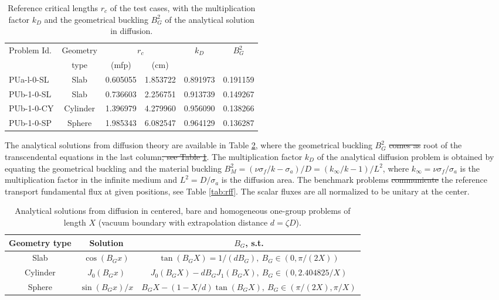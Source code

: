 \documentclass{ictt26}
\providecommand{\DIFadd}[1]{{\protect\color{blue}\uwave{#1}}} %
\providecommand{\DIFdel}[1]{{\protect\color{red}\sout{#1}}}                      %
\providecommand{\DIFaddbegin}{} %
\providecommand{\DIFaddend}{} %
\providecommand{\DIFdelbegin}{} %
\providecommand{\DIFdelend}{} %
\newcommand{\DIFscaledelfig}{0.5}
\newlength{\DIFdelgraphicswidth} %
\newlength{\DIFdelgraphicsheight} %
\newcommand{\DIFaddincludegraphics}[2][]{{\color{blue}\fbox{\DIFOincludegraphics[#1]{#2}}}} %
\newcommand{\DIFdelincludegraphics}[2][]{%
\sbox{\DIFdelgraphicsbox}{\DIFOincludegraphics[#1]{#2}}%
\settoboxwidth{\DIFdelgraphicswidth}{\DIFdelgraphicsbox} %
\settoboxtotalheight{\DIFdelgraphicsheight}{\DIFdelgraphicsbox} %
\scalebox{\DIFscaledelfig}{%
\parbox[b]{\DIFdelgraphicswidth}{\usebox{\DIFdelgraphicsbox}\\[-\baselineskip] \rule{\DIFdelgraphicswidth}{0em}}\llap{\resizebox{\DIFdelgraphicswidth}{\DIFdelgraphicsheight}{%
\setlength{\unitlength}{\DIFdelgraphicswidth}%
\begin{picture}(1,1)%
\thicklines\linethickness{2pt} %
{\color[rgb]{1,0,0}\put(0,0){\framebox(1,1){}}}%
{\color[rgb]{1,0,0}\put(0,0){\line( 1,1){1}}}%
{\color[rgb]{1,0,0}\put(0,1){\line(1,-1){1}}}%
\end{picture}%
}\hspace*{3pt}}} %
} %
\DeclareRobustCommand{\DIFaddbegin}{\DIFOaddbegin \let\includegraphics\DIFaddincludegraphics} %
\DeclareRobustCommand{\DIFaddend}{\DIFOaddend \let\includegraphics\DIFOincludegraphics} %
\DeclareRobustCommand{\DIFdelbegin}{\DIFOdelbegin \let\includegraphics\DIFdelincludegraphics} %
\DeclareRobustCommand{\DIFdelend}{\DIFOaddend \let\includegraphics\DIFOincludegraphics} %
\begin{document}
\begin{table}[htb]
\centering
\caption{Reference critical lengths $r_c$ of the test cases, with the multiplication factor $k_D$ and the geometrical buckling $B^2_G$ of the analytical solution in diffusion.}\label{tab:rc}
\begin{tabular}{l|c|c|c|c|c}
\multirow{2}{*}{Problem Id.} & Geometry & \multicolumn{2}{c|}{$r_c$}& \multirow{2}{*}{$k_D$} & \multirow{2}{*}{$B_G^2$}\\ \cline{3-4}
 & type & (mfp) & (cm) & & \\ \hline
PUa-l-0-SL  & Slab       & 0.605055     & 1.853722 & 0.891973 & 0.191159\\
PUb-1-0-SL  & Slab       & 0.736603   & 2.256751 & 0.913739 & 0.149267\\
PUb-1-0-CY  & Cylinder   & 1.396979     & 4.279960 & 0.956090 & 0.138266\\
PUb-1-0-SP  & Sphere     & 1.985343 & 6.082547 & 0.964129 & 0.136287\\
\end{tabular}
\end{table}

The analytical solutions from diffusion theory are available in Table \ref{tab:adsol}, where the geometrical buckling $B_G^2$ \DIFdelbegin \DIFdel{comes as }\DIFdelend \DIFaddbegin \DIFadd{is given by the }\DIFaddend root of the transcendental equations in the last column\DIFdelbegin \DIFdel{, see Table \ref{tab:rc}}\DIFdelend . The multiplication factor $k_D$ of the analytical diffusion problem is obtained by equating the geometrical buckling and the material buckling $B^2_M = (\nu\sigma_f/k - \sigma_a)/D = (k_\infty/k - 1)/L^2$, where $k_\infty = \nu\sigma_f / \sigma_a$ is the multiplication factor in the infinite medium and $L^2 = D/\sigma_a$ is the diffusion area. The benchmark problems \DIFdelbegin \DIFdel{communicate }\DIFdelend \DIFaddbegin \DIFadd{provide }\DIFaddend the reference transport fundamental flux at given positions, see Table \ref{tab:rff}. The scalar fluxes are all normalized to be unitary at the center.

\begin{table}[hbt]
\centering
\caption{Analytical solutions from diffusion in centered, bare and homogeneous one-group problems of length $X$ (vacuum boundary with extrapolation distance $d = \zeta D$).}\label{tab:adsol}
\begin{tabular}{c|c|c}
Geometry type & Solution & $B_G$, s.t.\\ \hline[1mm]
Slab & $\cos{(B_G x)}$ & $\tan{(B_G X)} = 1 / (d B_G), \: B_G \in (0, \pi /(2X))$\\[1mm]
Cylinder & $J_0 (B_G x)$ & $J_0(B_G X) - d B_G J_1(B_G X), \: B_G \in (0, 2.404825 / X)$ \\[1mm]
Sphere & $\sin{(B_G x)}/x$ & $B_G X - (1 - X / d) \tan{(B_G X)}, \: B_G \in (\pi/(2X), \pi/X)$ \\
\end{tabular}
\end{table}
\end{document}
